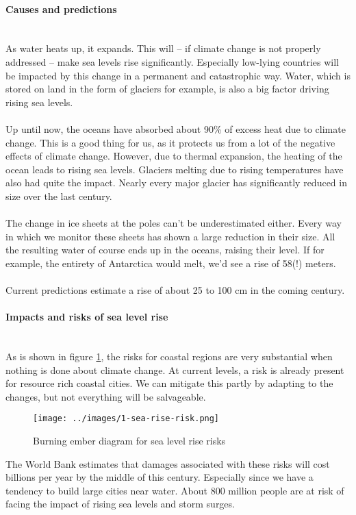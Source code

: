 \documentclass[../summary.tex]{subfiles}
\begin{document}
				\paragraph{Causes and predictions}\mbox{}\\
					As water heats up, it expands. This will -- if climate change is not properly addressed -- make sea levels rise significantly. Especially low-lying countries will be impacted by this change in a permanent and catastrophic way. Water, which is stored on land in the form of glaciers for example, is also a big factor driving rising sea levels.
					\\\\
					Up until now, the oceans have absorbed about 90\% of excess heat due to climate change. This is a good thing for us, as it protects us from a lot of the negative effects of climate change. However, due to thermal expansion, the heating of the ocean leads to rising sea levels. Glaciers melting due to rising temperatures have also had quite the impact. Nearly every major glacier has significantly reduced in size over the last century.
					\\\\
					The change in ice sheets at the poles can't be underestimated either. Every way in which we monitor these sheets has shown a large reduction in their size. All the resulting water of course ends up in the oceans, raising their level. If for example, the entirety of Antarctica would melt, we'd see a rise of 58(!) meters.
					\\\\
					Current predictions estimate a rise of about 25 to 100 cm in the coming century.
				
				\paragraph{Impacts and risks of sea level rise}\mbox{}\\
					As is shown in figure \ref{fig:1-sea-rise-risk}, the risks for coastal regions are very substantial when nothing is done about climate change. At current levels, a risk is already present for resource rich coastal cities. We can mitigate this partly by adapting to the changes, but not everything will be salvageable.\\
					
					\begin{figure}[h]
						\centering
						\texttt{[image: ../images/1-sea-rise-risk.png]}
						\caption{Burning ember diagram for sea level rise risks}
						\label{fig:1-sea-rise-risk}
					\end{figure}
					
					The World Bank estimates that damages associated with these risks will cost billions per year by the middle of this century. Especially since we have a tendency to build large cities near water. About 800 million people are at risk of facing the impact of rising sea levels and storm surges. 
	
\end{document}
